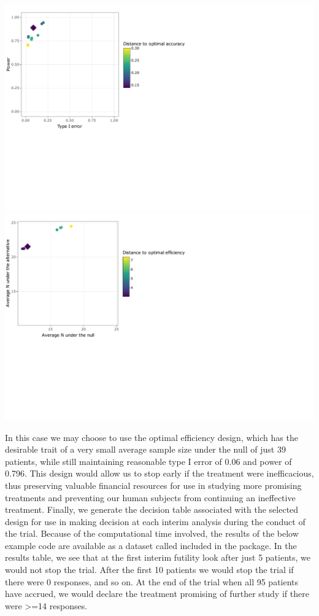 \begin{Schunk}

\includegraphics{zabor-ppseq_files/figure-latex/unnamed-chunk-7-1} 
\includegraphics{zabor-ppseq_files/figure-latex/unnamed-chunk-7-2} \end{Schunk}

In this case we may choose to use the optimal efficiency design, which
has the desirable trait of a very small average sample size under the
null of just 39 patients, while still maintaining reasonable type I
error of 0.06 and power of 0.796. This design would allow us to stop
early if the treatment were inefficacious, thus preserving valuable
financial resources for use in studying more promising treatments and
preventing our human subjects from continuing an ineffective treatment.
Finally, we generate the decision table associated with the selected
design for use in making decision at each interim analysis during the
conduct of the trial. Because of the computational time involved, the
results of the below example code are available as a dataset called
 included in the  package.
In the results table, we see that at the first interim futility look
after just 5 patients, we would not stop the trial. After the first 10
patients we would stop the trial if there were 0 responses, and so on.
At the end of the trial when all 95 patients have accrued, we would
declare the treatment promising of further study if there were
\textgreater=14 responses.


